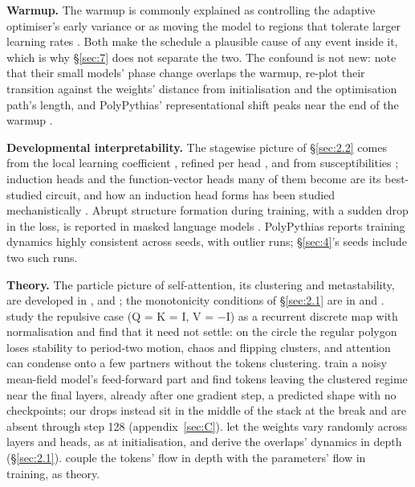 \documentclass[11pt]{article}
\begin{document}
\textbf{Warmup.} The warmup is commonly explained as controlling the adaptive optimiser's early variance \citep{liu2019} or as moving the model to regions that tolerate larger learning rates \citep{kalra2024}. Both make the schedule a plausible cause of any event inside it, which is why \S\ref{sec:7} does not separate the two. The confound is not new: \citet{olsson2022} note that their small models' phase change overlaps the warmup, \citet{chen2023} re-plot their transition against the weights' distance from initialisation and the optimisation path's length, and PolyPythias' representational shift peaks near the end of the warmup \citep{vanderwal2025}.

\textbf{Developmental interpretability.} The stagewise picture of \S\ref{sec:2.2} comes from the local learning coefficient \citep{hoogland2024}, refined per head \citep{wang2024}, and from susceptibilities \citep{wang2025}; induction heads \citep{olsson2022} and the function-vector heads many of them become \citep{yin2025} are its best-studied circuit, and how an induction head forms has been studied mechanistically \citep{singh2024}. Abrupt structure formation during training, with a sudden drop in the loss, is reported in masked language models \citep{chen2023}. PolyPythias \citep{vanderwal2025} reports training dynamics highly consistent across seeds, with outlier runs; \S\ref{sec:4}'s seeds include two such runs.

\textbf{Theory.} The particle picture of self-attention, its clustering and metastability, are developed in \citet{geshkovski2023,geshkovski2024}, \citet{bruno2024} and \citet{rigollet2025}; the monotonicity conditions of \S\ref{sec:2.1} are in \citet{geshkovski2023} and \citet{pendharkar2026}. \citet{gao2026} study the repulsive case (Q = K = I, V = $-$I) as a recurrent discrete map with normalisation and find that it need not settle: on the circle the regular polygon loses stability to period-two motion, chaos and flipping clusters, and attention can condense onto a few partners without the tokens clustering. \citet{isobe2026} train a noisy mean-field model's feed-forward part and find tokens leaving the clustered regime near the final layers, already after one gradient step, a predicted shape with no checkpoints; our drops instead sit in the middle of the stack at the break and are absent through step 128 (appendix~\ref{sec:C}). \citet{koubbi2026} let the weights vary randomly across layers and heads, as at initialisation, and derive the overlaps' dynamics in depth (\S\ref{sec:2.1}). \citet{herty2026} couple the tokens' flow in depth with the parameters' flow in training, as theory.
\end{document}
